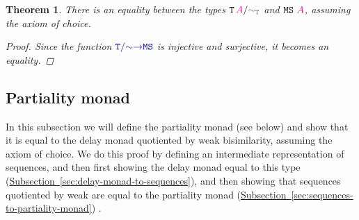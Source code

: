 \documentclass[twoside,11pt,openright]{report}
\theoremstyle{plain} %
\newtheorem{thm}{Theorem}[section]
\theoremstyle{definition}
\theoremstyle{remark}
\newcommand*{\subsectionref}[1]{\hyperref[sec:#1]{Subsection~\ref*{sec:#1}}}
\newcommand*{\type}[1]{\textcolor{magenta!90!black}{#1}}
\newcommand*{\relation}[1]{\textcolor{gray!75!black}{\ensuremath{\mathtt{#1}}}}
\newcommand*{\function}[1]{\textcolor{blue!60!black}{\ensuremath{\mathtt{#1}}}}
\newcommand*{\typeformer}[1]{\ensuremath{\mathtt{#1}}}
\begin{document}
\begin{thm}
  \label{thm:QM-QIIT-eq-multiset}
  There is an equality between the types \(\typeformer{T}\,\type{A}/\relation{\sim_{T}}\) and \(\typeformer{MS}~\type{A}\), assuming the axiom of choice.
  \begin{proof}
    Since the function \(\function{T/{\sim}{\rightarrow}MS}\) is injective and surjective, it becomes an equality.
  \end{proof}
\end{thm}

\subsection{Partiality monad}
In this subsection we will define the partiality monad (see below) and show that it is equal to the delay monad quotiented by weak bisimilarity, assuming the axiom of choice. We do this proof by defining an intermediate representation of sequences, and then first showing the delay monad equal to this type (\subsectionref{delay-monad-to-sequences}), and then showing that sequences quotiented by weak are equal to the partiality monad (\subsectionref{sequences-to-partiality-monad}) \cite{Partiality-Revisited}.
\end{document}
